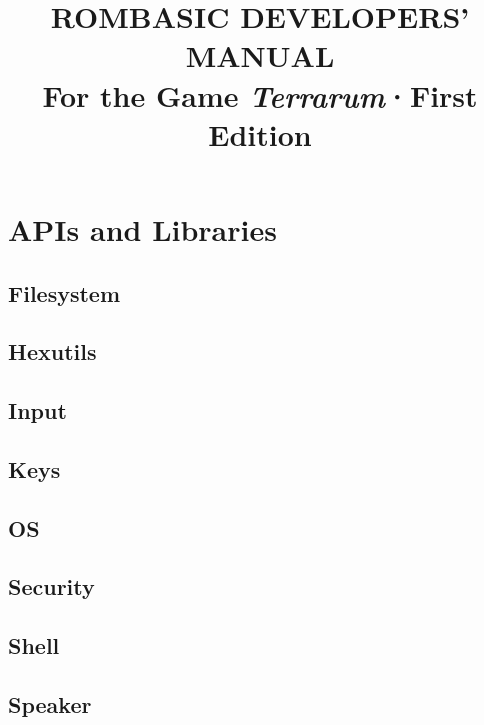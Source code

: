 \documentclass[10pt, stock, openany]{memoir}
\title{\textbf{ROMBASIC DEVELOPERS' \\ MANUAL} \\ \vspace{7mm} \large For the Game \emph{Terrarum}\quad ·\quad First Edition}
\date{}
\author{}
\let\oldsection\chapter
\renewcommand\chapter{\clearpage\oldsection}
\begin{document}
\begin{titlingpage}
\maketitle{}
\end{titlingpage}

\setcounter{page}{3}

\tableofcontents*



\part{APIs and Libraries}

\chapter{Filesystem}


\chapter{Hexutils}


\chapter{Input}


\chapter{Keys}


\chapter{OS}


\chapter{Security}


\chapter{Shell}


\chapter{Speaker}

\end{document}
